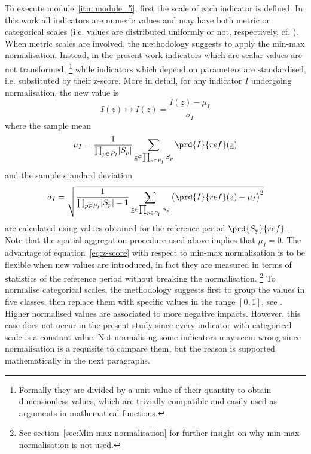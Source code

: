 To execute module~\ref{itm:module_5}, first the scale of each \gls{indicator} is defined. In this work all \glspl{indicator} are numeric values and may have both metric or categorical scales (i.e. values are distributed uniformly or not, respectively, cf. \cite[109]{2017GIZTheVulnerability}).
When metric scales are involved, the methodology suggests to apply the min-max normalisation. Instead, in the present work \glspl{indicator} which are scalar values are not transformed,%
\footnote{Formally they are divided by a unit value of their quantity to obtain dimensionless values, which are trivially compatible and easily used as arguments in mathematical functions.}
while \glspl{indicator} which depend on parameters are standardised, i.e. substituted by their z-score. More in detail, for any \gls{indicator} $I$ undergoing normalisation, the new value is
\begin{equation}
  \label{eq:z-score}
  I(\underline{z}) \mapsto I(\underline{z}) = \frac{I(\underline{z}) - \mu_I}{\sigma_I}
\end{equation}
where the sample mean
\begin{equation}
  \label{eq:sample_mean}
  \mu_I = \frac{1}{\prod_{p \in P_I} \abs{S_p}} \sum_{\underline{z} \in \prod_{p \in P_I} S_p} \prd{I}{ref}(\underline{z})
\end{equation}
and the sample standard deviation
\begin{equation}
  \label{eq:sample_standard_deviation}
  \sigma_I = \sqrt{\frac{1}{\prod_{p \in P_I} \abs{S_p} - 1} \sum_{\underline{z} \in \prod_{p \in P_I} S_p} \big( \prd{I}{ref}(\underline{z}) - \mu_I \big)^2}
\end{equation}
are calculated using values obtained for the reference period $\prd{S_\text{y}}{ref}$ \cite[84]{2008OECDHandbookOn}. Note that the spatial aggregation procedure used above implies that $\mu_I = 0$. The advantage of equation~\eqref{eq:z-score} with respect to min-max normalisation is to be flexible when new values are introduced, in fact they are measured in terms of statistics of the reference period without breaking the normalisation.%
\footnote{See section~\ref{sec:Min-max normalisation} for further insight on why min-max normalisation is not used.}
To normalise categorical scales, the methodology suggests first to group the values in five classes, then replace them with specific values in the range $[0, 1]$, see \cite[115-116]{2017GIZTheVulnerability}. Higher normalised values are associated to more negative impacts. However, this case does not occur in the present study since every \gls{indicator} with categorical scale is a constant value. Not normalising some \glspl{indicator} may seem wrong since normalisation is a requisite to compare them, but the reason is supported mathematically in the next paragraphs.

